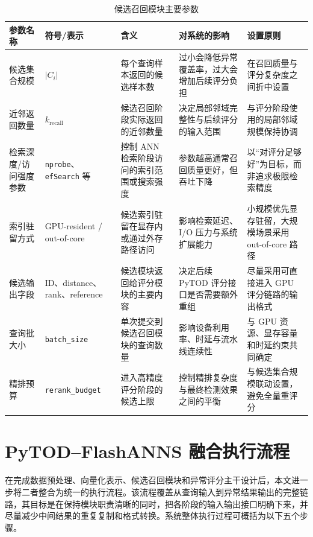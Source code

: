 \begin{table}[htbp]
  \caption{候选召回模块主要参数}
  \label{tab:recall-module-params}
  \centering
  \small
  \renewcommand{\arraystretch}{1.2}
  \begin{adjustbox}{max width=\linewidth}
  \begin{tabular}{P{2.6cm}P{2.7cm}P{3.2cm}P{4.2cm}P{4.2cm}}
    \toprule
    参数名称 & 符号/表示 & 含义 & 对系统的影响 & 设置原则\\
    \midrule
    候选集合规模 & $|C_i|$ & 每个查询样本返回的候选样本数 & 过小会降低异常覆盖率，过大会增加后续评分负担 & 在召回质量与评分复杂度之间折中设置\\
    近邻返回数量 & $k_{\mathrm{recall}}$ & 候选召回阶段实际返回的近邻数量 & 决定局部邻域完整性与后续评分的输入范围 & 与评分阶段使用的局部邻域规模保持协调\\
    检索深度/访问强度参数 & \texttt{nprobe}、\texttt{efSearch} 等 & 控制 ANN 检索阶段访问的索引范围或搜索强度 & 参数越高通常召回质量更好，但吞吐下降 & 以“对评分足够好”为目标，而非追求极限检索精度\\
    索引驻留方式 & GPU-resident / out-of-core & 候选索引驻留在显存内或通过外存路径访问 & 影响检索延迟、I/O 压力与系统扩展能力 & 小规模优先显存驻留，大规模场景采用 out-of-core 路径\\
    候选输出字段 & ID、distance、rank、reference & 候选模块返回给评分模块的主要内容 & 决定后续 PyTOD 评分接口是否需要额外重组 & 尽量采用可直接进入 GPU 评分链路的输出格式\\
    查询批大小 & \texttt{batch\_size} & 单次提交到候选召回模块的查询数量 & 影响设备利用率、时延与流水线连续性 & 与 GPU 资源、显存容量和时延约束共同确定\\
    精排预算 & \texttt{rerank\_budget} & 进入高精度评分阶段的候选上限 & 控制精排复杂度与最终检测效果之间的平衡 & 与候选集合规模联动设置，避免全量重评分\\
    \bottomrule
  \end{tabular}
  \end{adjustbox}
\end{table}

\FloatBarrier

\section{PyTOD--FlashANNS 融合执行流程}

在完成数据预处理、向量化表示、候选召回模块和异常评分主干设计后，本文进一步将二者整合为统一的执行流程。该流程覆盖从查询输入到异常结果输出的完整链路，其目标是在保持模块职责清晰的同时，把各阶段的输入输出接口明确下来，并尽量减少中间结果的重复复制和格式转换。系统整体执行过程可概括为以下五个步骤。

